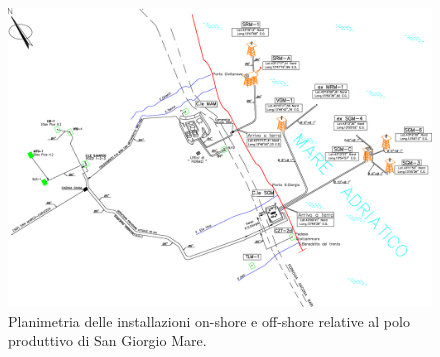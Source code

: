 \begin{figure}[htbp]
	\centering
	\includegraphics[width=\textwidth]{fig/test/asset.eps}
	\caption{Planimetria delle installazioni on-shore e off-shore relative al polo produttivo di San Giorgio Mare.}
	\label{fig:asset}
\end{figure}

